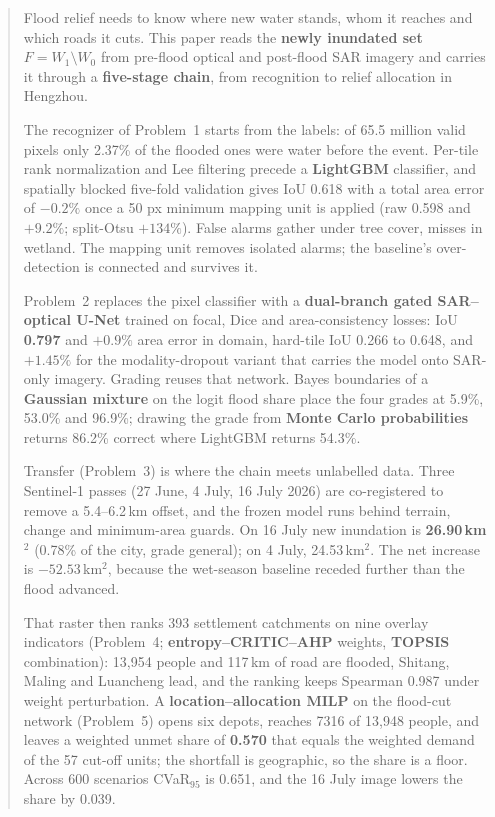 \documentclass[bwprint]{apmcmthesis}
\begin{document}
\begin{abstract}
\noindent\hspace*{2em}Flood relief needs to know where new water stands, whom it reaches and which roads it cuts. This paper reads the \textbf{newly inundated set} $F=W_1\setminus W_0$ from pre-flood optical and post-flood SAR imagery and carries it through a \textbf{five-stage chain}, from recognition to relief allocation in Hengzhou.

The recognizer of Problem~1 starts from the labels: of 65.5 million valid pixels only 2.37\% of the flooded ones were water before the event. Per-tile rank normalization and Lee filtering precede a \textbf{LightGBM} classifier, and spatially blocked five-fold validation gives IoU 0.618 with a total area error of $-0.2\%$ once a 50 px minimum mapping unit is applied (raw 0.598 and $+9.2\%$; split-Otsu $+134\%$). False alarms gather under tree cover, misses in wetland. The mapping unit removes isolated alarms; the baseline's over-detection is connected and survives it.

Problem~2 replaces the pixel classifier with a \textbf{dual-branch gated SAR--optical U-Net} trained on focal, Dice and area-consistency losses: IoU \textbf{0.797} and $+0.9\%$ area error in domain, hard-tile IoU 0.266 to 0.648, and $+1.45\%$ for the modality-dropout variant that carries the model onto SAR-only imagery. Grading reuses that network. Bayes boundaries of a \textbf{Gaussian mixture} on the logit flood share place the four grades at 5.9\%, 53.0\% and 96.9\%; drawing the grade from \textbf{Monte Carlo probabilities} returns 86.2\% correct where LightGBM returns 54.3\%.

Transfer (Problem~3) is where the chain meets unlabelled data. Three Sentinel-1 passes (27 June, 4 July, 16 July 2026) are co-registered to remove a 5.4--6.2\,km offset, and the frozen model runs behind terrain, change and minimum-area guards. On 16 July new inundation is \textbf{26.90\,km$^2$} (0.78\% of the city, grade general); on 4 July, 24.53\,km$^2$. The net increase is $-52.53$\,km$^2$, because the wet-season baseline receded further than the flood advanced.

That raster then ranks 393 settlement catchments on nine overlay indicators (Problem~4; \textbf{entropy--CRITIC--AHP} weights, \textbf{TOPSIS} combination): 13,954 people and 117\,km of road are flooded, Shitang, Maling and Luancheng lead, and the ranking keeps Spearman 0.987 under weight perturbation. A \textbf{location--allocation MILP} on the flood-cut network (Problem~5) opens six depots, reaches 7316 of 13,948 people, and leaves a weighted unmet share of \textbf{0.570} that equals the weighted demand of the 57 cut-off units; the shortfall is geographic, so the share is a floor. Across 600 scenarios CVaR$_{95}$ is 0.651, and the 16 July image lowers the share by 0.039.


\end{abstract}
\end{document}
